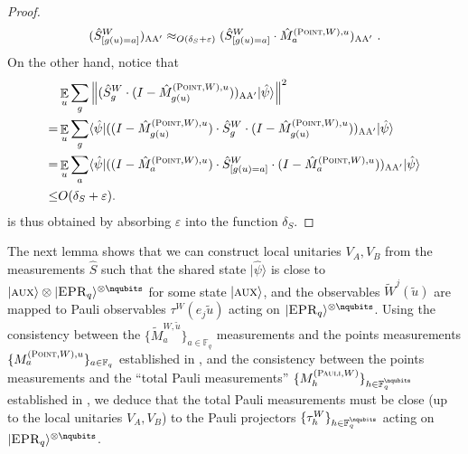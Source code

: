 \documentclass[11pt]{article}
\theoremstyle{definition}
\newcommand{\ket}[1]{|#1\rangle}
\newcommand{\bra}[1]{\langle#1|}
\newcommand{\Id}{\ensuremath{I}}
\newcommand{\F}{\ensuremath{\mathbb{F}}}
\newcommand{\eps}{\varepsilon}
\newcommand{\E}{\mathop{\mathbb{E}}\displaylimits}
\newcommand{\labelstyle}[1]{\ensuremath{\textsc{#1}}\xspace}
\newcommand{\EPR}{\labelstyle{EPR}}
\newcommand{\aux}{\labelstyle{aux}}
\newcommand{\alice}{\labelstyle{A}}
\newcommand{\typestyle}[1]{\ensuremath{\textsc{#1}}\xspace}
\newcommand{\Point}{\typestyle{Point}}
\newcommand{\Pauli}{\typestyle{Pauli}}
\begin{document}
\begin{proof}
\[
	(\hat{S}^W_{[g(u)=a]})_{\alice \alice'} \approx_{O(\delta_S + \eps)} (\hat{S}^W_{[g(u)=a]} \cdot \hat{M}^{(\Point, W), u}_{a})_{\alice \alice'}~.
\]
On the other hand, notice that
\begin{align*}
	&\E_u \sum_g \left \| (\hat{S}^W_{g} \cdot (\Id - \hat{M}^{(\Point, W), u}_{g(u)}))_{\alice \alice'} \ket{\hat{\psi}} \right \|^2 \\
	=& \E_u \sum_g \bra{\hat{\psi}} ((\Id - \hat{M}^{(\Point, W), u}_{g(u)}) \cdot \hat{S}^W_{g} \cdot (\Id - \hat{M}^{(\Point, W), u}_{g(u)}))_{\alice \alice'} \ket{\hat{\psi}} \\
	=& \E_u \sum_a \bra{\hat{\psi}} ((\Id - \hat{M}^{(\Point, W), u}_{a}) \cdot \hat{S}^W_{[g(u)=a]} \cdot (\Id - \hat{M}^{(\Point, W), u}_{a}))_{\alice \alice'} \ket{\hat{\psi}} \\
	\leq& O(\delta_S + \eps).
\end{align*}
 is thus obtained by absorbing $\eps$ into the function $\delta_S$.  
\end{proof}
	

 The next lemma shows that we can construct local unitaries $V_A,V_B$ from the measurements $\hat{S}$  such that the shared state $\ket{\hat{\psi}}$ is close to $\ket{\aux} \otimes \ket{\EPR_q}^{\otimes \nqubits}$ for some state $\ket{\aux}$, and the observables $\tilde{W}^j(\tilde{u})$ are mapped to Pauli observables $\tau^W(e_j \tilde{u})$ acting on $\ket{\EPR_q}^{\otimes \nqubits}$. Using the consistency between the $\{\tilde{M}^{W,\tilde{u}}_a\}_{a \in \F_q}$ measurements and the points measurements $\{M^{(\Point,W),u}_a\}_{a \in \F_q}$ established in , and the consistency between the points measurements and the ``total Pauli measurements'' $\{M^{(\Pauli,W)}_h\}_{h \in \F_q^\nqubits}$ established in , we deduce that the total Pauli measurements must be close (up to the local unitaries $V_A,V_B$) to the Pauli projectors $\{\tau^W_h\}_{h \in \F_q^\nqubits}$ acting on $\ket{\EPR_q}^{\otimes \nqubits}$.
\end{document}
